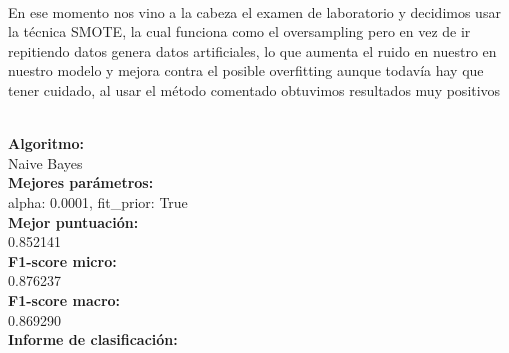 \documentclass{report}
\begin{document}
{                \paragraph*{}{
                    En ese momento nos vino a la cabeza el examen de laboratorio y decidimos usar la técnica SMOTE, la cual funciona como el oversampling pero en vez de ir repitiendo datos genera datos artificiales, lo que aumenta el ruido en nuestro en nuestro modelo y mejora contra el posible overfitting aunque todavía hay que tener cuidado, al usar el método comentado obtuvimos resultados muy positivos \color{green}{Mejor puntuación:}
                }
                    \\
                    \phantom{}
                    \\
                    \begin{center} {
                    \textbf{Algoritmo: }
                    \\
                    Naive Bayes
                    \\
                    \textbf{Mejores parámetros: }
                    \\
                    alpha: 0.0001, fit\_prior: True
                    \\
                    \textbf{Mejor puntuación: }
                    \\
                    0.852141
                    \\
                    \textbf{F1-score micro: }
                    \\
                    0.876237
                    \\
                    \textbf{F1-score macro: }
                    \\
                    0.869290
                    \\
                    \textbf{Informe de clasificación: }

}
\end{center}}
\end{document}
